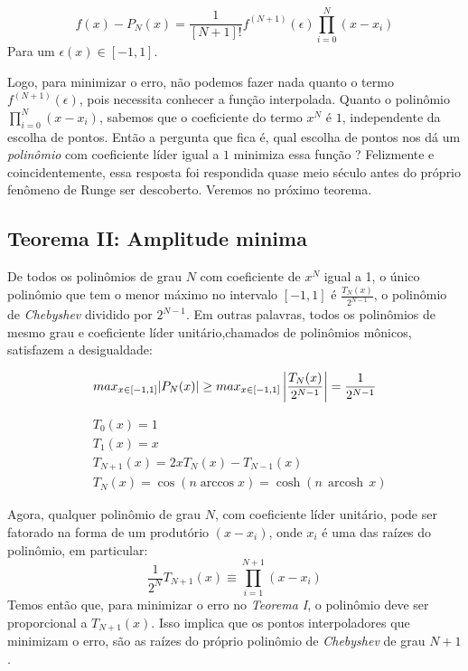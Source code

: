  \begin{equation}
 f(x) - P_N(x) = \frac{1}{[N+1]!}f^{(N+1)}(\epsilon)\prod^{N}_{i = 0} (x - x_i)
 \end{equation}
 Para um $\epsilon(x) \in [-1,1]$.
 
 Logo, para minimizar o erro, não podemos fazer nada quanto o termo $f^{(N+1)}(\epsilon)$, pois necessita conhecer a função interpolada. Quanto o polinômio $\prod^{N}_{i = 0} (x - x_i)$, sabemos que o coeficiente do termo $x^N$ é $1$, independente da escolha de pontos. Então a pergunta que fica é, qual escolha de pontos nos dá um \emph{polinômio} com coeficiente líder igual a $1$ minimiza essa função ? Felizmente e coincidentemente, essa resposta foi respondida quase meio século antes do próprio fenômeno de Runge ser descoberto. Veremos no próximo teorema.

 
\subsection{Teorema II: Amplitude minima}
 De todos os polinômios de grau $N$ com coeficiente de $x^N$ igual a 1, o único polinômio que tem o menor máximo no intervalo $[-1,1]$ é $\frac{T_N(x)}{2^{N-1}}$, o polinômio de \emph{Chebyshev}  dividido por $2^{N-1}$. Em outras palavras, todos os polinômios de mesmo grau e coeficiente líder unitário,chamados de polinômios mônicos, satisfazem a desigualdade:

\begin{equation}
	max_{x \in [-1,1]}|P_N(x)| \geq  max_{x \in [-1,1]} \left |\frac{T_N(x)}{2^{N-1}}  \right |  = \frac{1}{2^{N-1}}\\
\end{equation}

\begin{align}
    &T_0(x) = 1\\
    &T_1(x) = x\\
    &T_{N+1}(x) = 2xT_N(x) - T_{N-1}(x)\\
    &T_{N}(x) =\cos(n \arccos x)=\cosh(n\,\operatorname{arcosh}\,x)
\end{align}

 Agora, qualquer polinômio de grau $N$, com coeficiente líder unitário, pode ser fatorado na forma de um produtório  $(x - x_i)$, onde $x_i$ é uma das raízes do polinômio, em particular: 
 \begin{equation}
 \frac{1}{2^N}T_{N+1}(x) \equiv \prod_{i = 1}^{N+1} (x-x_i)
 \end{equation}
 Temos então que, para minimizar o erro no \emph{Teorema I}, o polinômio deve ser proporcional a $T_{N+1}(x)$. Isso implica que  os pontos interpoladores que minimizam o erro, são as raízes do próprio polinômio de \emph{Chebyshev} de grau $N+1$.
 
